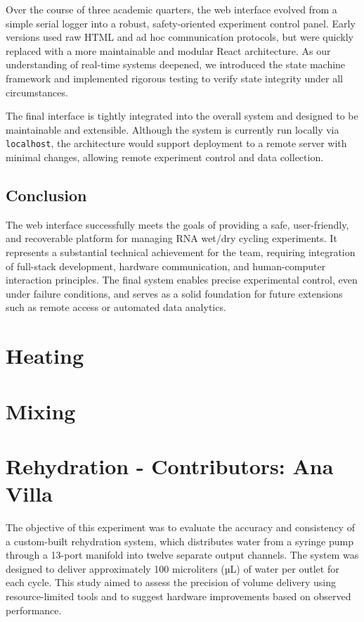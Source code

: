 \documentclass[12pt]{article}
\begin{document}
            Over the course of three academic quarters, the web interface evolved from a simple serial logger into a robust, safety-oriented experiment control panel. Early versions used raw HTML and ad hoc communication protocols, but were quickly replaced with a more maintainable and modular React architecture. As our understanding of real-time systems deepened, we introduced the state machine framework and implemented rigorous testing to verify state integrity under all circumstances. 
            
            The final interface is tightly integrated into the overall system and designed to be maintainable and extensible. Although the system is currently run locally via \texttt{localhost}, the architecture would support deployment to a remote server with minimal changes, allowing remote experiment control and data collection.
            
            \subsection{Conclusion}
            
            The web interface successfully meets the goals of providing a safe, user-friendly, and recoverable platform for managing RNA wet/dry cycling experiments. It represents a substantial technical achievement for the team, requiring integration of full-stack development, hardware communication, and human-computer interaction principles. The final system enables precise experimental control, even under failure conditions, and serves as a solid foundation for future extensions such as remote access or automated data analytics.



    
    
    \section{Heating}
    
    \section{Mixing}
    
    \section{Rehydration - Contributors: Ana Villa}
        The objective of this experiment was to evaluate the accuracy and consistency of a custom-built rehydration system, which distributes water from a syringe pump through a 13-port manifold into twelve separate output channels. The system was designed to deliver approximately 100 microliters (µL) of water per outlet for each cycle. This study aimed to assess the precision of volume delivery using resource-limited tools and to suggest hardware improvements based on observed performance.
        
\end{document}
